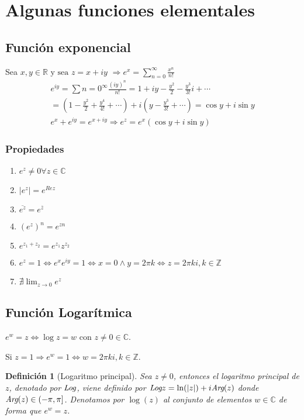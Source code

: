 \documentclass[10pt]{book}
\newtheorem{defi}{Definición}[chapter]
\newcommand{\R}{\mathbb{R}}
\newcommand{\C}{\mathbb{C}}
\newcommand{\Z}{\mathbb{Z}}
\newcommand{\Log}{\emph{Log}}
\newcommand{\Arg}{\emph{Arg}}
\begin{document}
\section{Algunas funciones elementales}
\subsection{Función exponencial}
Sea $x,y \in\R \text{ y sea } z = x+iy$
$\Rightarrow e^{x} = \sum_{n=0}^\infty \frac{x^n}{n!}$
\begin{multline*}
e^{iy} = \sum{n=0}^\infty \frac{(iy)^n}{n!} = 1 + iy - \frac{y^2}{2}-\frac{y^3}{3!}i + \cdots\\
= (1-\frac{y^2}{2} + \frac{y^4}{4!}+\cdots) +i(y-\frac{y^3}{3!}+\cdots) = \cos y + i \sin y\\
e^x + e^{iy} = e^{x+iy} \Rightarrow e^{z} = e^x(\cos y + i \sin y)
\end{multline*}
\subsubsection*{Propiedades}
\begin{enumerate}
\item $e^z \neq 0 \forall z \in \C$
\item $|e^{z}| = e^{Re z}$
\item $\overline{e^z} = e^{\overline z}$
\item $(e^z)^n = e^{zn}$
\item $e^{z_1+z_2} = e^{z_1}z^{z_2}$
\item $ e^z = 1 \Leftrightarrow e^x e^{iy}=1 \Leftrightarrow x = 0 \wedge y = 2\pi k \Leftrightarrow z = 2\pi ki, k\in \Z$
\item $\displaystyle \nexists \lim_{z \to 0} e^z$
\end{enumerate}

\subsection{Función Logarítmica}
$e^w = z \Leftrightarrow \log z = w$ con $z \neq 0 \in \C$.

Si $z=1 \Rightarrow e^w = 1 \Leftrightarrow w = 2\pi k i, k \in \Z$.
 
\begin{defi}[Logaritmo principal]
Sea $z\neq 0$, entonces el logaritmo principal de $z$, denotado por $\Log$, viene definido por $\Log z = \ln(|z|) + i \Arg(z)$ donde $\Arg(z)\in (-\pi,\pi]$. Denotamos por $\log(z)$ al conjunto de elementos $w \in \C$ de forma que $e^w = z$. 
\end{defi}
\end{document}

